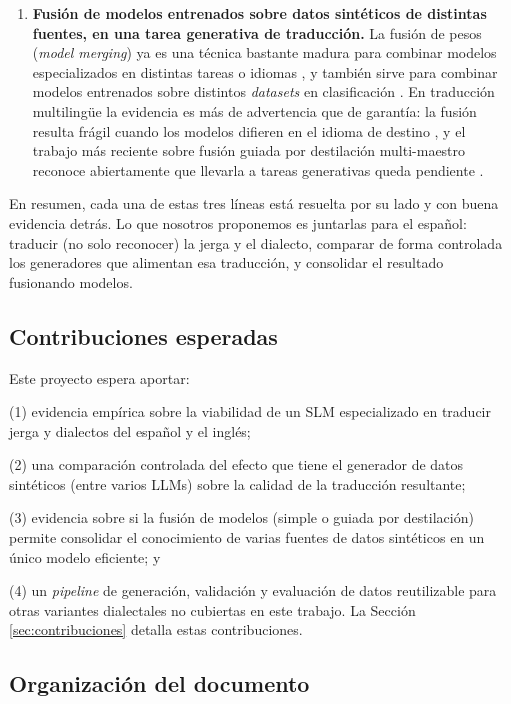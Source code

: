 \documentclass[11pt,a4paper]{article}
\begin{document}
\begin{enumerate}[label=(\roman*)]
    \item \textbf{Fusión de modelos entrenados sobre datos sintéticos de distintas fuentes, en una tarea generativa de traducción.} La fusión de pesos (\textit{model merging}) ya es una técnica bastante madura para combinar modelos especializados en distintas tareas o idiomas \cite{wortsman2022soups, ilharco2022taskarithmetic, yadav2023ties, yu2024dare, goddard2024mergekit}, y también sirve para combinar modelos entrenados sobre distintos \textit{datasets} en clasificación \cite{tao2025mergemix}. En traducción multilingüe la evidencia es más de advertencia que de garantía: la fusión resulta frágil cuando los modelos difieren en el idioma de destino \cite{gain2026mountdoom}, y el trabajo más reciente sobre fusión guiada por destilación multi-maestro reconoce abiertamente que llevarla a tareas generativas queda pendiente \cite{dalili2025multiteacher}.
\end{enumerate}

En resumen, cada una de estas tres líneas está resuelta por su lado y con buena evidencia detrás. Lo que nosotros proponemos es juntarlas para el español: traducir (no solo reconocer) la jerga y el dialecto, comparar de forma controlada los generadores que alimentan esa traducción, y consolidar el resultado fusionando modelos.

\subsection{Contribuciones esperadas}

Este proyecto espera aportar: 

(1) evidencia empírica sobre la viabilidad de un SLM especializado en traducir jerga y dialectos del español y el inglés; 

(2) una comparación controlada del efecto que tiene el generador de datos sintéticos (entre varios LLMs) sobre la calidad de la traducción resultante; 

(3) evidencia sobre si la fusión de modelos (simple o guiada por destilación) permite consolidar el conocimiento de varias fuentes de datos sintéticos en un único modelo eficiente; y 

(4) un \textit{pipeline} de generación, validación y evaluación de datos reutilizable para otras variantes dialectales no cubiertas en este trabajo. La Sección \ref{sec:contribuciones} detalla estas contribuciones.

\subsection{Organización del documento}
\end{document}
